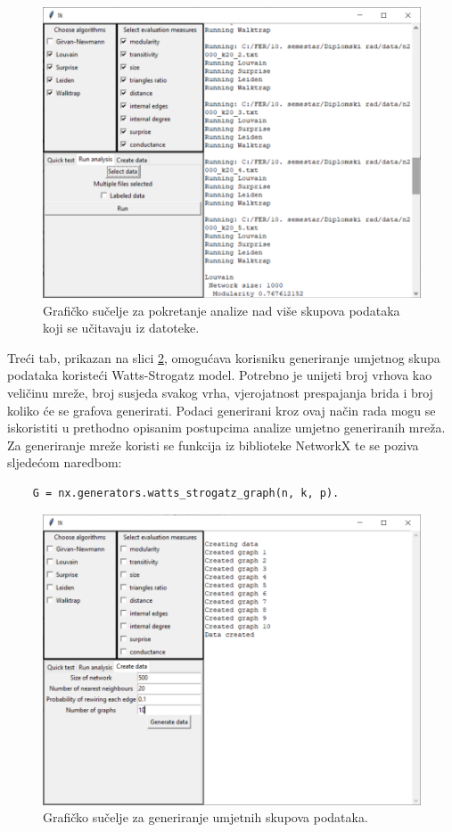 \begin{figure}
	\includegraphics[width=\linewidth]{images/gui-analysis.png}
	\caption{Grafičko sučelje za pokretanje analize nad više skupova podataka koji se učitavaju iz datoteke.}
	\label{fig:gui2}
\end{figure}


Treći tab, prikazan na slici \ref{fig:gui3}, omogućava korisniku generiranje umjetnog skupa podataka koristeći Watts-Strogatz model. Potrebno je unijeti broj vrhova kao veličinu mreže, broj susjeda svakog vrha, vjerojatnost prespajanja brida i broj koliko će se grafova generirati. Podaci generirani kroz ovaj način rada mogu se iskoristiti u prethodno opisanim postupcima analize umjetno generiranih mreža. Za generiranje mreže koristi se funkcija iz biblioteke NetworkX te se poziva sljedećom naredbom:
\begin{verbatim}
	G = nx.generators.watts_strogatz_graph(n, k, p).
\end{verbatim}


\begin{figure}
	\includegraphics[width=\linewidth]{images/gui-generating.png}
	\caption{Grafičko sučelje za generiranje umjetnih skupova podataka.}
	\label{fig:gui3}
\end{figure}

